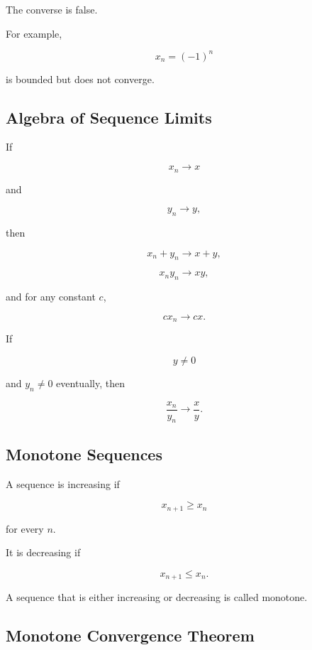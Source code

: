 The converse is false.

For example,

\[
x_n=(-1)^n
\]

is bounded but does not converge.

\subsection{Algebra of Sequence Limits}
\label{subsec:algebra-sequence-limits}

If

\[
x_n\to x
\]

and

\[
y_n\to y,
\]

then

\[
\boxed{
x_n+y_n\to x+y,
}
\]

\[
\boxed{
x_ny_n\to xy,
}
\]

and for any constant \(c\),

\[
\boxed{
cx_n\to cx.
}
\]

If

\[
y\neq0
\]

and \(y_n\neq0\) eventually, then

\[
\boxed{
\frac{x_n}{y_n}
\to
\frac{x}{y}.
}
\]

\subsection{Monotone Sequences}
\label{subsec:monotone-sequences}

A sequence is increasing if

\[
\boxed{
x_{n+1}\geq x_n
}
\]

for every \(n\).

It is decreasing if

\[
\boxed{
x_{n+1}\leq x_n.
}
\]

A sequence that is either increasing or decreasing is called monotone.

\subsection{Monotone Convergence Theorem}
\label{subsec:monotone-convergence-sequences}

